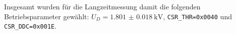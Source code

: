 
Insgesamt wurden für die Langzeitmessung damit die folgenden Betriebsparameter gewählt: $U_D=\SI{1.801(18)}{\kilo\V}$, \texttt{CSR\_THR=0x0040} und \texttt{CSR\_DDC=0x001E}.
